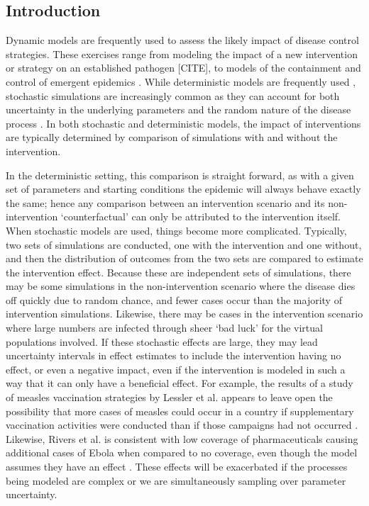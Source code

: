 \documentclass[PTRSB]{rsos}
\begin{document}
\begin{multicols}{2}
\section{Introduction}
Dynamic models are frequently used to assess the likely impact of disease control strategies.
These exercises range from modeling the impact of a new intervention or strategy on an established pathogen [CITE], to models of the containment and control of emergent epidemics \cite{lessler-et-al:2016}.
While deterministic models are frequently used \cite{fraser-et-al:2004}, stochastic simulations are increasingly common as they can account for both uncertainty in the underlying parameters and the random nature of the disease process \cite{ferguson-et-al:2003}.
In both stochastic and deterministic models, the impact of interventions are typically determined by comparison of simulations with and without the intervention.

In the deterministic setting, this comparison is straight forward, as with a given set of parameters and starting conditions the epidemic will always behave exactly the same; hence any comparison between an intervention scenario and its non-intervention ‘counterfactual’ can only be attributed to the intervention itself.
When stochastic models are used, things become more complicated.
Typically, two sets of simulations are conducted, one with the intervention and one without, and then the distribution of outcomes from the two sets are compared to estimate the intervention effect.
Because these are independent sets of simulations, there may be some simulations in the non-intervention scenario where the disease dies off quickly due to random chance, and fewer cases occur than the majority of intervention simulations.
Likewise, there may be cases in the intervention scenario where large numbers are infected through sheer ‘bad luck’ for the virtual populations involved.
If these stochastic effects are large, they may lead uncertainty intervals in effect estimates to include the intervention having no effect, or even a negative impact, even if the intervention is modeled in such a way that it can only have a beneficial effect.
For example, the results of a study of measles vaccination strategies by Lessler et al. appears to leave open the possibility that more cases of measles could occur in a country if supplementary vaccination activities were conducted than if those campaigns had not occurred \cite{lessler-et-al:2016}.
Likewise, Rivers et al. is consistent with low coverage of pharmaceuticals causing additional cases of Ebola when compared to no coverage, even though the model assumes they have an effect \cite{rivers-et-al:2014}.
These effects will be exacerbated if the processes being modeled are complex or we are simultaneously sampling over parameter uncertainty.


\end{multicols}
\end{document}
